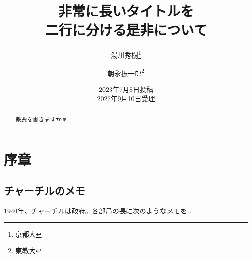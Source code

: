 \documentclass{jlreq}
\begin{document}
\title{非常に長いタイトルを \\ 二行に分ける是非について}
\author{湯川秀樹\thanks{京都大} \and 朝永振一郎\thanks{東教大}}
\date{2023年7月8日投稿 \\ 2023年9月10日受理}
\maketitle
\begin{abstract}
    概要を書きますかぁ
\end{abstract}
\section{序章}
\subsection{チャーチルのメモ}
 1940年、チャーチルは政府。各部局の長に次のようなメモを…
\end{document}
